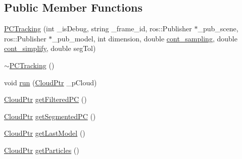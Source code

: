 \subsection*{\-Public \-Member \-Functions}
\begin{DoxyCompactItemize}
\item 
\hyperlink{class_p_c_tracking_a4480a9bdf9aa029d4d6a72ec476d9204}{\-P\-C\-Tracking} (int \-\_\-is\-Debug, string \-\_\-frame\-\_\-id, ros\-::\-Publisher $\ast$\-\_\-pub\-\_\-scene, ros\-::\-Publisher $\ast$\-\_\-pub\-\_\-model, int dimension, double \hyperlink{main_8cpp_a0a25311ae4d454e85cd8e49128769450}{cont\-\_\-sampling}, double \hyperlink{main_8cpp_ada331b7eda6ecf7597fd0372011d6bb9}{cont\-\_\-simplify}, double seg\-Tol)
\item 
\hyperlink{class_p_c_tracking_aa417614aaf71af12379e668a7e7263a9}{$\sim$\-P\-C\-Tracking} ()
\item 
void \hyperlink{class_p_c_tracking_a2bb6af5b13ac0b6a349bc71569ee9169}{run} (\hyperlink{common_8h_a36884aa4a3c181fa4c284d79329ad166}{\-Cloud\-Ptr} \-\_\-p\-Cloud)
\item 
\hyperlink{common_8h_a36884aa4a3c181fa4c284d79329ad166}{\-Cloud\-Ptr} \hyperlink{class_p_c_tracking_a32952787cd951817440784991e606b83}{get\-Filtered\-P\-C} ()
\item 
\hyperlink{common_8h_a36884aa4a3c181fa4c284d79329ad166}{\-Cloud\-Ptr} \hyperlink{class_p_c_tracking_a0ab89d2360e5c86b0213c3562509a4c0}{get\-Segmented\-P\-C} ()
\item 
\hyperlink{common_8h_a36884aa4a3c181fa4c284d79329ad166}{\-Cloud\-Ptr} \hyperlink{class_p_c_tracking_afcc7afdfc328c5938ecde97bc93a8bc2}{get\-Last\-Model} ()
\item 
\hyperlink{common_8h_a36884aa4a3c181fa4c284d79329ad166}{\-Cloud\-Ptr} \hyperlink{class_p_c_tracking_afafda70997c0f439a09290812130a9e7}{get\-Particles} ()
\end{DoxyCompactItemize}
